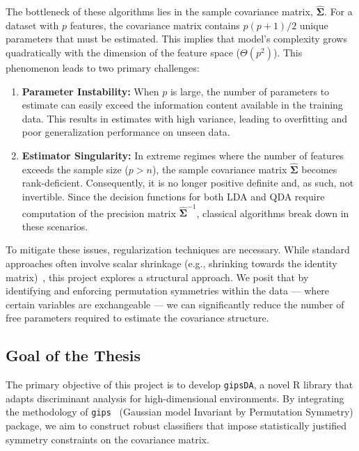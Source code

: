 \documentclass[a4paper,11pt,twoside]{report}
\theoremstyle{definition}
\begin{document}
The bottleneck of these algorithms lies in the sample covariance matrix, $\hat{\boldsymbol{\Sigma}}$.
For a dataset with $p$ features, the covariance matrix contains $p(p+1)/2$ unique parameters that must be estimated.
This implies that model's complexity grows quadratically with the dimension of the feature space ($\Theta(p^2)$).
This phenomenon leads to two primary challenges:

\begin{enumerate}
    \item \textbf{Parameter Instability:} When $p$ is large, the number of parameters to estimate can easily exceed the information content available in the training data. This results in estimates with high variance, leading to overfitting and poor generalization performance on unseen data.
    \item \textbf{Estimator Singularity:} In extreme regimes where the number of features exceeds the sample size ($p > n$), the sample covariance matrix $\hat{\boldsymbol{\Sigma}}$ becomes rank-deficient. Consequently, it is no longer positive definite and, as such, not invertible. Since the decision functions for both LDA and QDA require computation of the precision matrix $\hat{\boldsymbol{\Sigma}}^{-1}$, classical algorithms break down in these scenarios.
\end{enumerate}

To mitigate these issues, regularization techniques are necessary.
While standard approaches often involve scalar shrinkage (e.g., shrinking towards the identity matrix)~\cite{friedman1989regularized, ledoit2004well}, this project explores a structural approach.
We posit that by identifying and enforcing permutation symmetries within the data — where certain variables are exchangeable — we can significantly reduce the number of free parameters required to estimate the covariance structure.

\subsection*{Goal of the Thesis}

The primary objective of this project is to develop \texttt{gipsDA}, a novel R library that adapts discriminant analysis for high-dimensional environments.
By integrating the methodology of \texttt{gips}~\cite{JSSv112i07} (Gaussian model Invariant by Permutation Symmetry) package, we aim to construct robust classifiers that impose statistically justified symmetry constraints on the covariance matrix.
\end{document}
